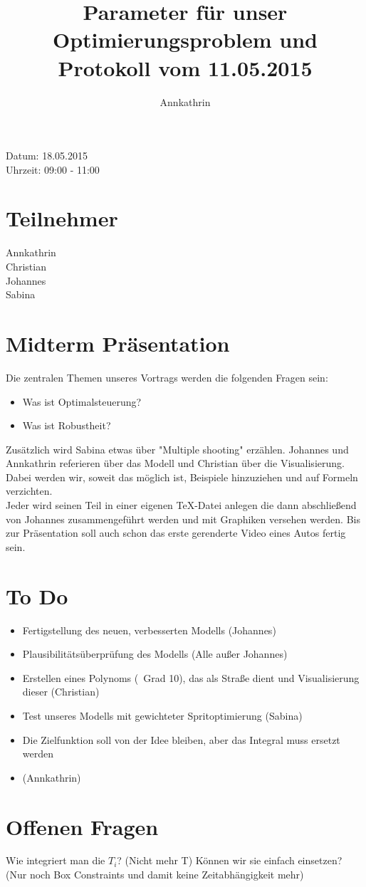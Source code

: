 \documentclass[12pt,a4paper]{article}
\theoremstyle{definition}
\theoremstyle{plain}
\begin{document}
	
\title{Parameter für unser Optimierungsproblem und Protokoll vom 11.05.2015}
\author{Annkathrin}
\maketitle

Datum: 18.05.2015\\
Uhrzeit: 09:00 - 11:00

\tableofcontents

\section{Teilnehmer}
Annkathrin\\
Christian\\
Johannes\\
Sabina

\section{Midterm Präsentation}

Die zentralen Themen unseres Vortrags werden die folgenden Fragen sein:

\begin{itemize}
\item Was ist Optimalsteuerung?

\item Was ist Robustheit?
\end{itemize}
Zusätzlich wird Sabina etwas über "Multiple shooting" erzählen. Johannes und Annkathrin referieren über das Modell und Christian über die Visualisierung.
Dabei werden wir, soweit das möglich ist, Beispiele hinzuziehen und auf Formeln verzichten. \\
Jeder wird seinen Teil in einer eigenen TeX-Datei anlegen die dann abschließend von Johannes zusammengeführt werden und mit Graphiken versehen werden.
Bis zur Präsentation soll auch schon das erste gerenderte Video eines Autos fertig sein.

\section{To Do}
\begin{itemize}
\item Fertigstellung des neuen, verbesserten Modells (Johannes)

\item Plausibilitätsüberprüfung des Modells (Alle außer Johannes)

\item Erstellen eines Polynoms (~Grad 10), das als Straße dient und Visualisierung dieser (Christian)

\item Test unseres Modells mit gewichteter Spritoptimierung (Sabina)

\item Die Zielfunktion soll von der Idee bleiben, aber das Integral muss ersetzt werden

\item  (Annkathrin)
\end{itemize}

\section{Offenen Fragen}
Wie integriert man die $T_i$? (Nicht mehr T)
Können wir sie einfach einsetzen? (Nur noch Box Constraints und damit keine Zeitabhängigkeit mehr)
\end{document}
